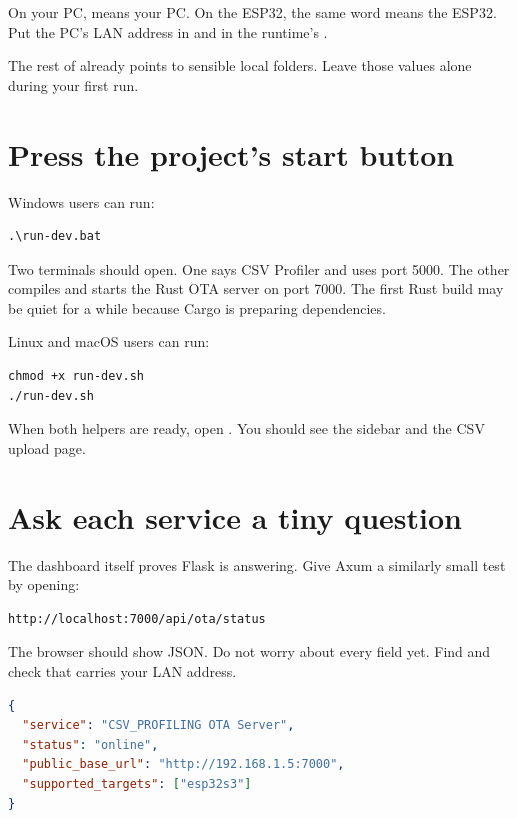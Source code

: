 \begin{warningbox}
On your PC,  means your PC. On the ESP32, the same word means the ESP32. Put the PC's LAN address in  and in the runtime's .
\end{warningbox}

The rest of  already points to sensible local folders. Leave those values alone during your first run.

\section{Press the project's start button}

Windows users can run:

\begin{lstlisting}
.\run-dev.bat
\end{lstlisting}

Two terminals should open. One says CSV Profiler and uses port 5000. The other compiles and starts the Rust OTA server on port 7000. The first Rust build may be quiet for a while because Cargo is preparing dependencies.

Linux and macOS users can run:

\begin{lstlisting}
chmod +x run-dev.sh
./run-dev.sh
\end{lstlisting}

When both helpers are ready, open . You should see the sidebar and the CSV upload page.

\section{Ask each service a tiny question}

The dashboard itself proves Flask is answering. Give Axum a similarly small test by opening:

\begin{lstlisting}[numbers=none]
http://localhost:7000/api/ota/status
\end{lstlisting}

The browser should show JSON. Do not worry about every field yet. Find  and check that  carries your LAN address.

\begin{lstlisting}[language=JSON,numbers=none]
{
  "service": "CSV_PROFILING OTA Server",
  "status": "online",
  "public_base_url": "http://192.168.1.5:7000",
  "supported_targets": ["esp32s3"]
}
\end{lstlisting}

